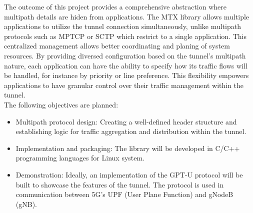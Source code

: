 \documentclass{article} %
\begin{document}
The outcome of this project provides a comprehensive abstraction where multipath details are hiden from applications.
The MTX library allows multiple applications to utilize the tunnel connection simultaneously, unlike multipath protocols such as MPTCP or SCTP which restrict to a single application.
This centralized management allows better coordinating and planing of system resources.
By providing diversed configuration based on the tunnel's multipath nature, each application can have the ability to specify how its traffic flows will be handled, for instance by priority or line preference. This flexibility empowers applications to have granular control over their traffic management within the tunnel.
\\

The following objectives are planned:
\begin{itemize}
    \item Multipath protocol design: Creating a well-defined header structure and establishing logic for traffic aggregation and distribution within the tunnel.
    \item Implementation and packaging: The library will be developed in C/C++ programming languages for Linux system.
    \item Demonstration: Ideally, an implementation of the GPT-U protocol will be built to showcase the features of the tunnel. The protocol is used in communication between 5G's UPF (User Plane Function) and gNodeB (gNB).
\end{itemize}
\end{document}
